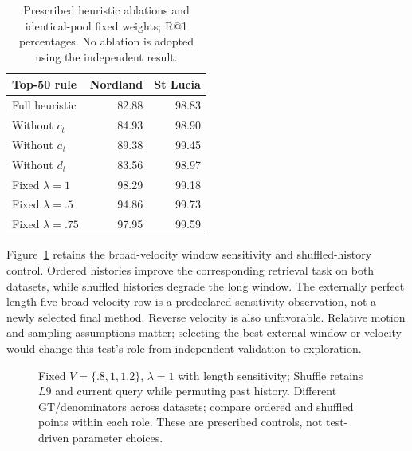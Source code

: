 \documentclass[conference]{IEEEtran}
\begin{document}
\begin{table}[t]\centering\small
\caption{Prescribed heuristic ablations and identical-pool fixed weights; R@1 percentages. No ablation is adopted using the independent result.}\label{tab:ablations}
\begin{tabular}{lrr}\toprule
Top-50 rule & Nordland & St Lucia\\\midrule
Full heuristic & 82.88 & 98.83\\
Without $c_t$ & 84.93 & 98.90\\
Without $a_t$ & 89.38 & 99.45\\
Without $d_t$ & 83.56 & 98.97\\
Fixed $\lambda=1$ & 98.29 & 99.18\\
Fixed $\lambda=.5$ & 94.86 & 99.73\\
Fixed $\lambda=.75$ & 97.95 & 99.59\\
\bottomrule\end{tabular}\end{table}

Figure~\ref{fig:sequence} retains the broad-velocity window sensitivity and shuffled-history control. Ordered histories improve the corresponding retrieval task on both datasets, while shuffled histories degrade the long window. The externally perfect length-five broad-velocity row is a predeclared sensitivity observation, not a newly selected final method. Reverse velocity is also unfavorable. Relative motion and sampling assumptions matter; selecting the best external window or velocity would change this test's role from independent validation to exploration.

\begin{figure}[t]\centering
{}
\caption{Fixed $V=\{.8,1,1.2\}$, $\lambda=1$ with length sensitivity; Shuffle retains $L9$ and current query while permuting past history. Different GT/denominators across datasets; compare ordered and shuffled points within each role. These are prescribed controls, not test-driven parameter choices.}\label{fig:sequence}
\end{figure}
\end{document}
